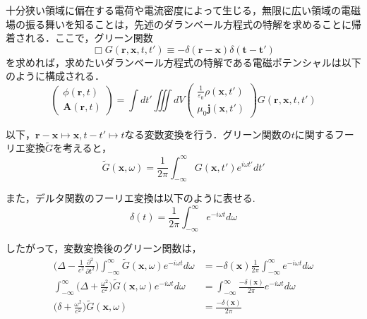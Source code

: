 \documentclass[10pt, a5paper, twoside]{jsarticle}
\theoremstyle{definition}
\begin{document}
		十分狭い領域に偏在する電荷や電流密度によって生じる，無限に広い領域の電磁場の振る舞いを知ることは，先述のダランベール方程式の特解を求めることに帰着される．ここで，グリーン関数
		\begin{equation*}
			\Box G (\boldsymbol{r}, \boldsymbol{x}, t, t') \equiv - \delta(\boldsymbol{r} - \boldsymbol{x}) \delta (\boldsymbol{t} - \boldsymbol{t'})
		\end{equation*}
		を求めれば，求めたいダランベール方程式の特解である電磁ポテンシャルは以下のように構成される．
		\begin{equation*}
			\begin{pmatrix} \phi (\boldsymbol{r}, t) \\ \boldsymbol{A} (\boldsymbol{r}, t) \end{pmatrix} = \displaystyle \int dt' \iiint dV \begin{pmatrix} \displaystyle \frac{1}{\varepsilon_0} \rho (\boldsymbol{x}, t') \\ \mu_0 \boldsymbol{j} (\boldsymbol{x}, t') \end{pmatrix} G (\boldsymbol{r}, \boldsymbol{x}, t, t')
		\end{equation*}

		以下，$\boldsymbol{r} - \boldsymbol{x} \mapsto \boldsymbol{x}, t - t' \mapsto t$なる変数変換を行う．グリーン関数の$t$に関するフーリエ変換$\widetilde{G}$を考えると，
		\begin{equation*}
			\widetilde{G} (\boldsymbol{x}, \omega) = \displaystyle \frac{1}{2 \pi} \int_{- \infty}^{\infty} G (\boldsymbol{x}, t') e^{i \omega t'} dt'
		\end{equation*}

		また，デルタ関数のフーリエ変換は以下のように表せる.
		\begin{equation*}
			\delta (t) = \displaystyle \frac{1}{2 \pi} \int_{- \infty}^{\infty} e^{-i \omega t} d \omega
		\end{equation*}

		したがって，変数変換後のグリーン関数は，
		\begin{align*} \bigg( \Delta - \displaystyle \frac{1}{c^2} \frac{{\partial}^2}{\partial t^2} \bigg) \int_{- \infty}^{\infty} \widetilde{G} (\boldsymbol{x}, \omega) e^{-i \omega t} d \omega &= - \delta (\boldsymbol{x}) \frac{1}{2 \pi} \int_{- \infty}^{\infty} e^{- i \omega t} d \omega \\ \int_{- \infty}^{\infty} \bigg( \Delta + \displaystyle \frac{{\omega}^2}{c^2} \bigg) \widetilde{G} (\boldsymbol{x}, \omega) e^{-i \omega t} d \omega &= \int_{- \infty}^{\infty} \frac{- \delta (\boldsymbol{x})}{2 \pi} e^{-i \omega t} d \omega \\ \bigg( \delta + \displaystyle \frac{{\omega}^2}{c^2} \bigg) \widetilde{G} (\boldsymbol{x}, \omega) &= \frac{- \delta (\boldsymbol{x})}{2 \pi} \end{align*}
		
\end{document}
